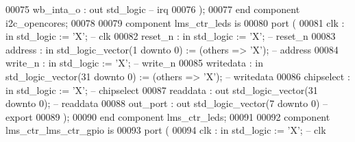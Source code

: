 \begin{DoxyCode}
00075             wb\_inta\_o  : \textcolor{keywordflow}{out}   \textcolor{comment}{std\_logic}\textcolor{keyword}{                                        -- irq}
00076         );
00077     \textcolor{keywordflow}{end} \textcolor{keywordflow}{component} \textcolor{vhdlchar}{i2c_opencores};
00078 
00079     \textcolor{keywordflow}{component} lms\_ctr\_leds \textcolor{keywordflow}{is}
00080         \textcolor{keywordflow}{port} (
00081             clk        : \textcolor{keywordflow}{in}  \textcolor{comment}{std\_logic}                     := 'X';             \textcolor{keyword}{-- clk}
00082             reset\_n    : \textcolor{keywordflow}{in}  \textcolor{comment}{std\_logic}                     := 'X';             \textcolor{keyword}{-- reset\_n}
00083             address    : \textcolor{keywordflow}{in}  \textcolor{comment}{std\_logic\_vector}(\textcolor{vhdllogic}{}\textcolor{vhdllogic}{1} \textcolor{keywordflow}{downto} \textcolor{vhdllogic}{}\textcolor{vhdllogic}{0})  := (\textcolor{keywordflow}{others} => 'X'); \textcolor{keyword}{-- address}
00084             write\_n    : \textcolor{keywordflow}{in}  \textcolor{comment}{std\_logic}                     := 'X';             \textcolor{keyword}{-- write\_n}
00085             writedata  : \textcolor{keywordflow}{in}  \textcolor{comment}{std\_logic\_vector}(\textcolor{vhdllogic}{}\textcolor{vhdllogic}{31} \textcolor{keywordflow}{downto} \textcolor{vhdllogic}{}\textcolor{vhdllogic}{0}) := (\textcolor{keywordflow}{others} => 'X'); \textcolor{keyword}{-- writedata}
00086             chipselect : \textcolor{keywordflow}{in}  \textcolor{comment}{std\_logic}                     := 'X';             \textcolor{keyword}{-- chipselect}
00087             readdata   : \textcolor{keywordflow}{out} \textcolor{comment}{std\_logic\_vector}(\textcolor{vhdllogic}{}\textcolor{vhdllogic}{31} \textcolor{keywordflow}{downto} \textcolor{vhdllogic}{}\textcolor{vhdllogic}{0});                    \textcolor{keyword}{-- readdata}
00088             out\_port   : \textcolor{keywordflow}{out} \textcolor{comment}{std\_logic\_vector}(\textcolor{vhdllogic}{}\textcolor{vhdllogic}{7} \textcolor{keywordflow}{downto} \textcolor{vhdllogic}{}\textcolor{vhdllogic}{0})\textcolor{keyword}{                      -- export}
00089         );
00090     \textcolor{keywordflow}{end} \textcolor{keywordflow}{component} \textcolor{vhdlchar}{lms_ctr_leds};
00091 
00092     \textcolor{keywordflow}{component} lms\_ctr\_lms\_ctr\_gpio \textcolor{keywordflow}{is}
00093         \textcolor{keywordflow}{port} (
00094             clk        : \textcolor{keywordflow}{in}  \textcolor{comment}{std\_logic}                     := 'X';             \textcolor{keyword}{-- clk}

\end{DoxyCode}
